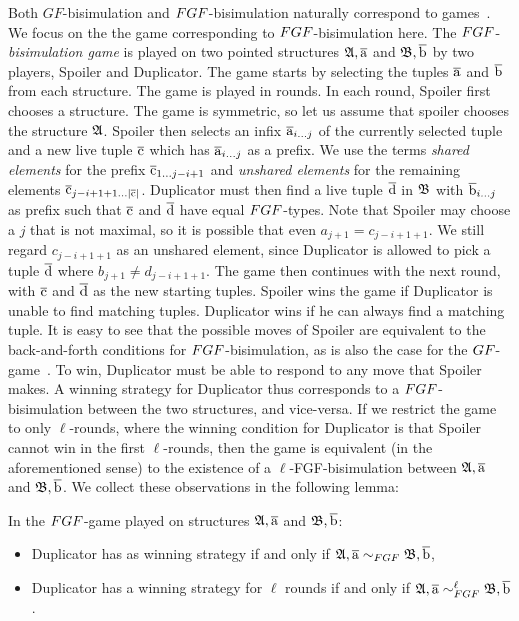 Both $GF$-bisimulation and $\FGF$-bisimulation naturally correspond to games~\cite[Sec. 1.2.1]{Gradel014}.
We focus on the the game corresponding to $\FGF$-bisimulation here.
The $\FGF$-\emph{bisimulation game} is played on two pointed structures ${\mathfrak{A}}, \overline{\mathrm{a}}$ and ${\mathfrak{B}}, \overline{\mathrm{b}}$ by two players, Spoiler and Duplicator.
The game starts by selecting the tuples $\overline{\mathrm{a}}$ and $\overline{\mathrm{b}}$ from each structure.
The game is played in rounds.
In each round, Spoiler first chooses a structure.
The game is symmetric, so let us assume that spoiler chooses the structure ${\mathfrak{A}}$.
Spoiler then selects an infix $\overline{\mathrm{a}}_{i\ldots j}$ of the currently selected tuple and a new live tuple $\overline{\mathrm{c}}$ which has $\overline{\mathrm{a}}_{i\ldots j}$ as a prefix.
We use the terms \emph{shared elements} for the prefix $\overline{\mathrm{c}}_{1\ldots j-i+1}$ and \emph{unshared elements} for the remaining elements $\overline{\mathrm{c}}_{j-i+1+1\ldots|\overline{\mathrm{c}}|}$.
Duplicator must then find a live tuple $\overline{\mathrm{d}}$ in ${\mathfrak{B}}$ with $\overline{\mathrm{b}}_{i\ldots j}$ as prefix such that $\overline{\mathrm{c}}$ and $\overline{\mathrm{d}}$ have equal $\FGF$-types.
Note that Spoiler may choose a $j$ that is not maximal, so it is possible that even $a_{j+1} = c_{j-i+1+1}$.
We still regard $c_{j-i+1+1}$ as an unshared element, since Duplicator is allowed to pick a tuple $\overline{\mathrm{d}}$ where $b_{j+1} \neq d_{j-i+1+1}$.
The game then continues with the next round, with $\overline{\mathrm{c}}$ and $\overline{\mathrm{d}}$ as the new starting tuples.
Spoiler wins the game if Duplicator is unable to find matching tuples.
Duplicator wins if he can always find a matching tuple.
It is easy to see that the possible moves of Spoiler are equivalent to the back-and-forth conditions for $\FGF$-bisimulation, as is also the case for the $\GF$-game~\cite[Sec.\ 3.2]{Gradel014}.
To win, Duplicator must be able to respond to any move that Spoiler makes.
A winning strategy for Duplicator thus corresponds to a $\FGF$-bisimulation between the two structures, and vice-versa.
If we restrict the game to only $\ell$-rounds, where the winning condition for Duplicator is that Spoiler cannot win in the first $\ell$-rounds, then the game is equivalent (in the aforementioned sense) to the existence of a $\ell$-FGF-bisimulation between ${\mathfrak{A}}, \overline{\mathrm{a}}$ and ${\mathfrak{B}}, \overline{\mathrm{b}}$.
We collect these observations in the following lemma:

\begin{lemma}
  In the $\FGF$-game played on structures ${\mathfrak{A}}, \overline{\mathrm{a}}$ and ${\mathfrak{B}}, \overline{\mathrm{b}}$:
  \begin{itemize}
    \item Duplicator has as winning strategy if and only if $\str{A}, \elemtuplea \bisimto_{\FGF} \str{B}, \elemtupleb$,
    \item Duplicator has a winning strategy for $\ell$ rounds if and only if $\str{A}, \elemtuplea \bisimto_{\FGF}^{\ell} \str{B}, \elemtupleb$.
  \end{itemize}
\end{lemma}
